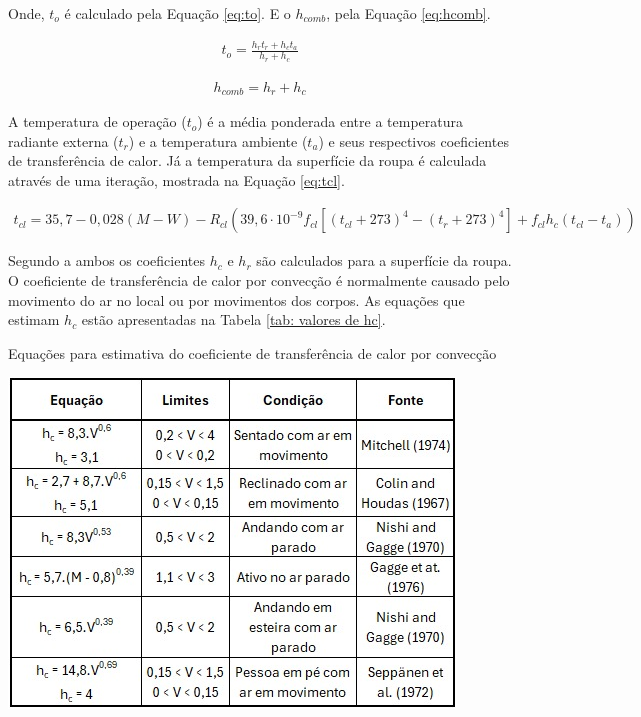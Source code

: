 \documentclass[acronym,symbols,table]{fei}
\begin{document}
Onde, $t_{o}$ é calculado pela Equação \ref{eq:to}. E o $h_{comb}$, pela Equação \ref{eq:hcomb}.

\begin{equation} \label{eq:to}
    \begin{aligned}
   t_{o}= \frac{h_{r}t_{r}+h_{c}t_{a}}{h_{r}+h_{c}}
    \end{aligned}
\end{equation}

\begin{equation} \label{eq:hcomb}
    \begin{aligned}
   h_{comb}=h_{r}+h_{c}
    \end{aligned}
\end{equation}

A temperatura de operação ($t_{o}$) é a média ponderada entre a temperatura radiante externa ($t_{r}$) e a temperatura ambiente ($t_{a}$) e seus respectivos coeficientes de transferência de calor. Já a temperatura da superfície da roupa é calculada através de uma iteração, mostrada na Equação \ref{eq:tcl}.

\begin{equation} \label{eq:tcl}
    \begin{aligned}
   t_{cl}= 35,7-0,028(M-W) - R_{cl}(39,6\cdot10^{-9}f_{cl}[(t_{cl}+273)^4-(t_{r}+273)^4]+f_{cl}h_{c}(t_{cl}-t_{a}))
    \end{aligned}
\end{equation}

Segundo a \textcite{ASHRAE2009} ambos os coeficientes $h_{c}$ e $h_{r}$ são calculados para a superfície da roupa. O coeficiente de transferência de calor por convecção é normalmente causado pelo movimento do ar no local ou por movimentos dos corpos. As equações que estimam $h_{c}$ estão apresentadas na Tabela \ref{tab: valores de hc}. 

\begin{table}[!htb] 
 \centering
    \caption{Equações para estimativa do coeficiente de transferência de calor por convecção}
    \includegraphics[width=0.5\linewidth]{Tabelas/tabela-hc.jpeg}
    \label{tab: valores de hc}
\end{table}
\end{document}
